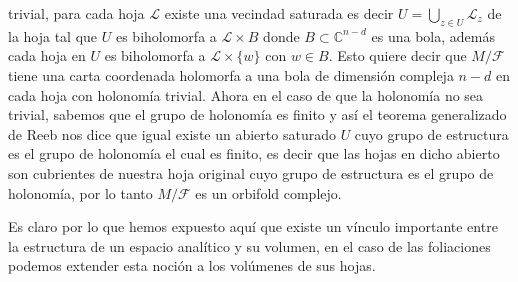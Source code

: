 \documentclass[letterpaper]{report}
\newcommand{\co}{\ensuremath{\mathbb C }}
\begin{document}
trivial, para cada hoja $\mathcal{L}$ existe una vecindad saturada es decir $U=\bigcup_{z\in U}\mathcal{L}_z$ de la hoja tal que $U$ es biholomorfa a $\mathcal{L}\times B$ donde
$B\subset\co^{n-d}$ es una bola, adem\'as cada hoja en $U$ es biholomorfa a $\mathcal{L}\times\{w\}$ con $w\in B$. Esto quiere decir que $M/\mathcal{F}$ tiene una carta coordenada
holomorfa a una bola de dimensi\'on compleja $n-d$ en cada hoja con holonom\'ia trivial. Ahora en el caso de que la holonom\'ia 
no sea trivial, sabemos que el grupo de holonom\'ia es finito y as\'i el teorema generalizado de Reeb \cite{Thurston} nos dice que
igual existe un abierto saturado $U$ cuyo grupo de estructura es el grupo de holonom\'ia el cual es finito, es decir que las hojas
en dicho abierto son cubrientes de nuestra hoja original cuyo grupo de estructura es el grupo de holonom\'ia, por lo tanto
$M/\mathcal{F}$ es un orbifold complejo.

Es claro por lo que hemos expuesto aqu\'i que existe un v\'inculo importante entre la estructura de un espacio anal\'itico y su volumen,
en el caso de las foliaciones podemos extender esta noci\'on a los vol\'umenes de sus hojas.
\end{document}
